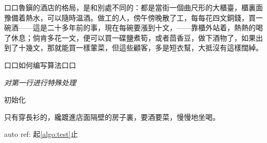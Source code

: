 \documentclass[type=bachelor]{bithesis}
\begin{document}
\frontmatter
\mainmatter

口口魯鎭的酒店的格局，是和別處不同的：都是當街一個曲尺形的大櫃臺，櫃裏面豫備着熱水，可以隨時温酒。做工的人，傍午傍晚散了工，每每花四文銅錢，買一碗酒——這是二十多年前的事，現在每碗要漲到十文，——靠櫃外站着，熱熱的喝了休息；倘肯多花一文，便可以買一碟鹽煮筍，或者茴香豆，做下酒物了，如果出到了十幾文，那就能買一樣葷菜，但這些顧客，多是短衣幫，大抵沒有這樣闊綽。

\begin{algorithm}[H]
  \caption{口口如何编写算法口口} \label{algo:test}


  \BlankLine


  \emph{对第一行进行特殊处理}\;

  初始化\;
\end{algorithm}

只有穿長衫的，纔踱進店面隔壁的房子裏，要酒要菜，慢慢地坐喝。

auto ref: 起\autoref{algo:test}止
\end{document}
